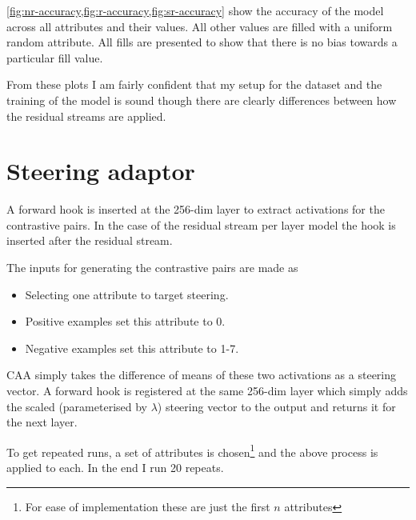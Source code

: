 \cref{fig:nr-accuracy,fig:r-accuracy,fig:sr-accuracy} show the accuracy of the model across all attributes and their values.
All other values are filled with a uniform random attribute.
All fills are presented to show that there is no bias towards a particular fill value.

From these plots I am fairly confident that my setup for the dataset and the training of the model is sound though there are clearly differences between how the residual streams are applied.

\section{Steering adaptor}

A forward hook is inserted at the 256-dim layer to extract activations for the contrastive pairs.
In the case of the residual stream per layer model the hook is inserted after the residual stream.

The inputs for generating the contrastive pairs are made as

\begin{itemize}[nolistsep]
    \item Selecting one attribute to target steering.
    \item Positive examples set this attribute to 0.
    \item Negative examples set this attribute to 1-7.
\end{itemize}

CAA simply takes the difference of means of these two activations as a steering vector.
A forward hook is registered at the same 256-dim layer which simply adds the scaled (parameterised by $\lambda$) steering vector to the output and returns it for the next layer.

To get repeated runs, a set of attributes is chosen\footnote{For ease of implementation these are just the first $n$ attributes} and the above process is applied to each.
In the end I run 20 repeats.

